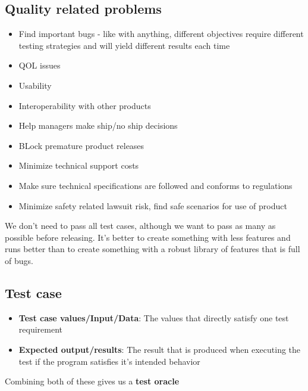 \documentclass[12pt]{book}
\begin{document}
\subsection*{Quality related problems}
\begin{itemize}
  \item Find important bugs - like with anything, different objectives require different testing strategies and will yield different results each time
  \item QOL issues
  \item Usability
  \item Interoperability with other products
  \item Help managers make ship/no ship decisions
  \item BLock premature product releases
  \item Minimize technical support costs
  \item Make sure technical specifications are followed and conforms to regulations
  \item Minimize safety related lawsuit risk, find safe scenarios for use of product
\end{itemize}

We don't need to pass all test cases, although we want to pass as many as possible before releasing. It's better to create something with less features and runs better than to create something with a robust library of features that is full of bugs.

\subsection*{Test case}
\begin{itemize}
  \item \textbf{Test case values/Input/Data}: The values that directly satisfy one test requirement
  \item \textbf{Expected output/results}: The result that is produced when executing the test if the program satisfies it's intended behavior
\end{itemize}

Combining both of these gives us a \textbf{test oracle}
\end{document}
